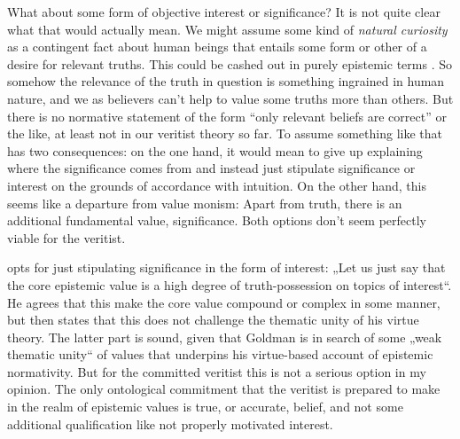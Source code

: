 \documentclass[12pt,numbers=noenddot]{scrartcl}
\begin{document}
What about some form of objective interest or significance? It is not quite clear what that would actually mean. We might assume some kind of \emph{natural curiosity} as a contingent fact about human beings that entails some form or other of a desire for relevant truths. This could be cashed out in purely epistemic terms \autocite[333]{Ahlstrom-Vij2013}. So somehow the relevance of the truth in question is something ingrained in human nature, and we as believers can't help to value some truths more than others. But there is no normative statement of the form “only relevant beliefs are correct” or the like, at least not in our veritist theory so far. To assume something like that has two consequences: on the one hand, it would mean to give up explaining where the significance comes from and instead just stipulate significance or interest on the grounds of accordance with intuition. On the other hand, this seems like a departure from value monism: Apart from truth, there is an additional fundamental value, significance. Both options don't seem perfectly viable for the veritist.

\textcite[61]{Goldman2002-GOLTUO-2} opts for just stipulating significance in the form of interest: „Let us just say that the core epistemic value is a high degree of truth-possession on topics of interest“. He agrees that this make the core value compound or complex in some manner, but then states that this does not challenge the thematic unity of his virtue theory. The latter part is sound, given that Goldman is in search of some „weak thematic unity“ of values that underpins his virtue-based account of epistemic normativity. But for the committed veritist this is not a serious option in my opinion. The only ontological commitment that the veritist is prepared to make in the realm of epistemic values is true, or accurate, belief, and not some additional qualification like not properly motivated interest.
\end{document}
